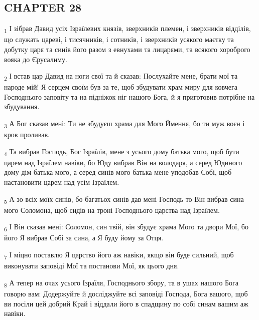 \subsection{CHAPTER 28}
\begin{tcolorbox}
\textsubscript{1} І зібрав Давид усіх Ізраїлевих князів, зверхників племен, і зверхників відділів, що служать цареві, і тисячників, і сотників, і зверхників усякого маєтку та добутку царя та синів його разом з евнухами та лицарями, та всякого хороброго вояка до Єрусалиму.
\end{tcolorbox}
\begin{tcolorbox}
\textsubscript{2} І встав цар Давид на ноги свої та й сказав: Послухайте мене, брати мої та народе мій! Я серцем своїм був за те, щоб збудувати храм миру для ковчега Господнього заповіту та на підніжок ніг нашого Бога, й я приготовив потрібне на збудування.
\end{tcolorbox}
\begin{tcolorbox}
\textsubscript{3} А Бог сказав мені: Ти не збудуєш храма для Мого Ймення, бо ти муж воєн і кров проливав.
\end{tcolorbox}
\begin{tcolorbox}
\textsubscript{4} Та вибрав Господь, Бог Ізраїлів, мене з усього дому батька мого, щоб бути царем над Ізраїлем навіки, бо Юду вибрав Він на володаря, а серед Юдиного дому дім батька мого, а серед синів мого батька мене уподобав Собі, щоб настановити царем над усім Ізраїлем.
\end{tcolorbox}
\begin{tcolorbox}
\textsubscript{5} А зо всіх моїх синів, бо багатьох синів дав мені Господь то Він вибрав сина мого Соломона, щоб сидів на троні Господнього царства над Ізраїлем.
\end{tcolorbox}
\begin{tcolorbox}
\textsubscript{6} І Він сказав мені: Соломон, син твій, він збудує храма Мого та двори Мої, бо його Я вибрав Собі за сина, а Я буду йому за Отця.
\end{tcolorbox}
\begin{tcolorbox}
\textsubscript{7} І міцно поставлю Я царство його аж навіки, якщо він буде сильний, щоб виконувати заповіді Мої та постанови Мої, як цього дня.
\end{tcolorbox}
\begin{tcolorbox}
\textsubscript{8} А тепер на очах усього Ізраїля, Господнього збору, та в ушах нашого Бога говорю вам: Додержуйте й досліджуйте всі заповіді Господа, Бога вашого, щоб ви посіли цей добрий Край і віддали його в спадщину по собі синам вашим аж навіки.
\end{tcolorbox}
